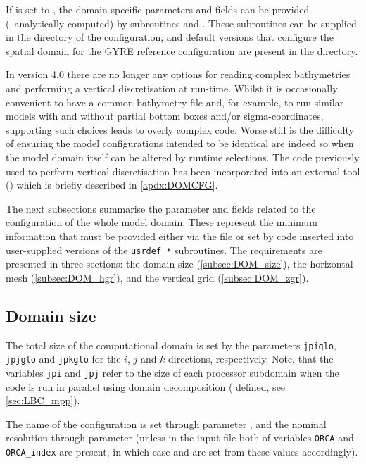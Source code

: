 \documentclass[../main/NEMO_manual]{subfiles}
\begin{document}
If  is set to ,
the domain-specific parameters and fields can be provided (\eg\ analytically computed) by
subroutines  and .
These subroutines can be supplied in the  directory of the configuration,
and default versions that configure the spatial domain for the GYRE reference configuration are
present in the  directory.

In version 4.0 there are no longer any options for reading complex bathymetries and
performing a vertical discretisation at run-time.
Whilst it is occasionally convenient to have a common bathymetry file and, for example,
to run similar models with and without partial bottom boxes and/or sigma-coordinates,
supporting such choices leads to overly complex code.
Worse still is the difficulty of ensuring the model configurations intended to be identical are
indeed so when the model domain itself can be altered by runtime selections.
The code previously used to perform vertical discretisation has been incorporated into
an external tool () which is briefly described in \autoref{apdx:DOMCFG}.

The next subsections summarise the parameter and fields related to
the configuration of the whole model domain.
These represent the minimum information that must be provided either via
the  file or
set by code inserted into user-supplied versions of the \texttt{usrdef\_*} subroutines.
The requirements are presented in three sections:
the domain size (\autoref{subsec:DOM_size}), the horizontal mesh (\autoref{subsec:DOM_hgr}),
and the vertical grid (\autoref{subsec:DOM_zgr}).

\subsection{Domain size}
\label{subsec:DOM_size}

The total size of the computational domain is set by the parameters \texttt{jpiglo}, \texttt{jpjglo} and
\texttt{jpkglo} for the $i$, $j$ and $k$ directions, respectively.
Note, that the variables \texttt{jpi} and \texttt{jpj} refer to
the size of each processor subdomain when the code is run in parallel using domain decomposition
( defined, see \autoref{sec:LBC_mpp}).

The name of the configuration is set through parameter ,
and the nominal resolution through parameter 
(unless in the input file both of variables \texttt{ORCA} and \texttt{ORCA\_index} are present,
in which case  and  are set from these values accordingly).
\end{document}
